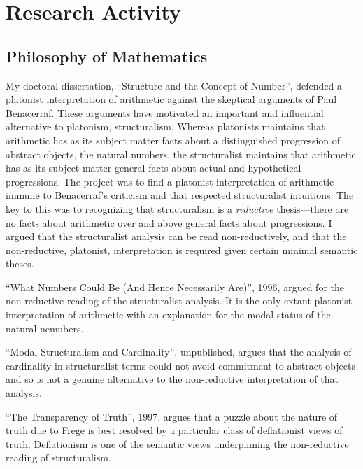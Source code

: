 \documentclass[contbibnum]{cv}
\begin{document}


\section{Research Activity}\label{sec:research_activity} %

\subsection{Philosophy of Mathematics}\label{sub:philosophy_of_mathematics} %

My doctoral dissertation, ``Structure and the Concept of Number'', defended a platonist interpretation of arithmetic against the skeptical arguments of Paul Benacerraf. These arguments have motivated an important and influential alternative to platonism, structuralism. Whereas platonists maintains that arithmetic has as its subject matter facts about a distinguished progression of abstract objects, the natural numbers, the structuralist maintains that arithmetic has as its subject matter general facts about actual and hypothetical progressions. The project was to find a platonist interpretation of arithmetic immune to Benacerraf's criticism and that respected structuralist intuitions. The key to this was to recognizing that structuralism is a \emph{reductive} thesis---there are no facts about arithmetic over and above general facts about progressions. I argued that the structuralist analysis can be read non-reductively, and that the non-reductive, platonist, interpretation is required given certain minimal semantic theses. 

``What Numbers Could Be (And Hence Necessarily Are)'', 1996, argued for the non-reductive reading of the structuralist analysis. It is the only extant platonist interpretation of arithmetic with an explanation for the modal status of the natural nemubers.

``Modal Structuralism and Cardinality'', unpublished, argues that the analysis of cardinality in structuralist terms could not avoid commitment to abstract objects and so is not a genuine alternative to the non-reductive interpretation of that analysis.

``The Transparency of Truth'', 1997, argues that a puzzle about the nature of truth due to Frege is best resolved by a particular class of deflationist views of truth. Deflationism is one of the semantic views underpinning the non-reductive reading of structuralism.
\end{document}
